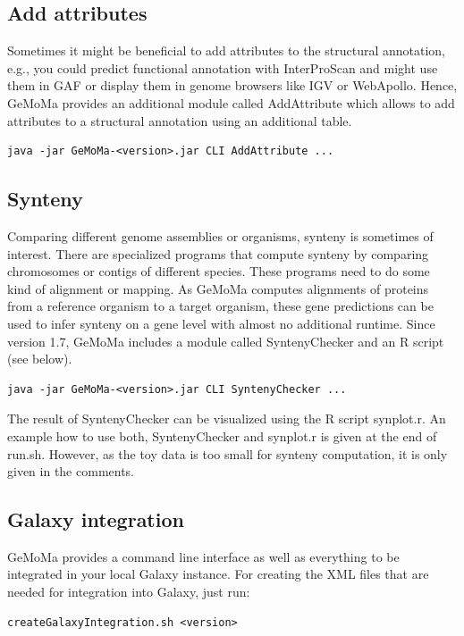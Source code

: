 \documentclass{article}
\begin{document}
\subsection{Add attributes}
Sometimes it might be beneficial to add attributes to the structural annotation, e.g., you could predict functional annotation with InterProScan and might use them in GAF or display them in genome browsers like IGV or WebApollo. Hence, GeMoMa provides an additional module called AddAttribute which allows to add attributes to a structural annotation using an additional table.

\begin{verbatim}
java -jar GeMoMa-<version>.jar CLI AddAttribute ...
\end{verbatim}

\subsection{Synteny}
Comparing different genome assemblies or organisms, synteny is sometimes of interest. There are specialized programs that compute synteny by comparing chromosomes or contigs of different species. These programs need to do some kind of alignment or mapping. As GeMoMa computes alignments of proteins from a reference organism to a target organism, these gene predictions can be used to infer synteny on a gene level with almost no additional runtime. Since version 1.7, GeMoMa includes a module called SyntenyChecker and an R script (see below).

\begin{verbatim}
java -jar GeMoMa-<version>.jar CLI SyntenyChecker ...
\end{verbatim}

The result of SyntenyChecker can be visualized using the R script synplot.r. An example how to use both, SyntenyChecker and synplot.r is given at the end of run.sh. However, as the toy data is too small for synteny computation, it is only given in the comments.

\subsection{Galaxy integration}
GeMoMa provides a command line interface as well as everything to be integrated in your local Galaxy instance. For creating the XML files that are needed for integration into Galaxy, just run: 
\begin{verbatim}
createGalaxyIntegration.sh <version>
\end{verbatim}
\end{document}
